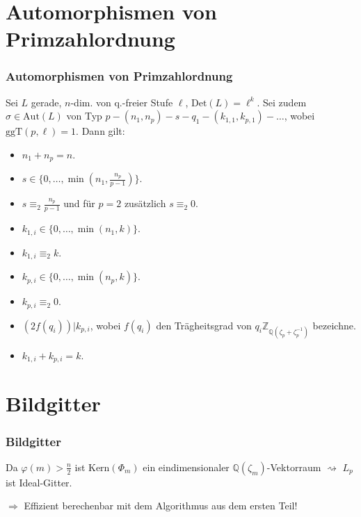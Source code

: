 \documentclass{beamer}
\newcommand{\Z}{\mathbb{Z}}
\newcommand{\Q}{\mathbb{Q}}
\newcommand{\Det}{\text{Det}}
\newcommand{\Kern}{\text{Kern}}
\newcommand{\ggT}{\text{ggT}}
\newcommand{\Aut}{\text{Aut}}
\begin{document}
\section{Automorphismen von Primzahlordnung}
\frame{\tableofcontents[currentsection]}
\begin{frame}[plain]
	\frametitle{Automorphismen von Primzahlordnung}
	\begin{Satz}
		Sei $L$ gerade, $n$-dim. von q.-freier Stufe $\ell$, $\Det(L) = \ell^k$. Sei zudem $\sigma \in \Aut(L)$ von Typ $p - (n_1, n_p) - s - q_1 - (k_{1,1}, k_{p,1}) - \dots$, wobei $\ggT(p, \ell) = 1$. Dann gilt:
		\begin{itemize}
			\item $n_1 + n_p = n$.
			\item $s \in \lbrace 0, \dots, \min(n_1, \frac{n_p}{p-1}) \rbrace$.
			\item $s \equiv_2 \frac{n_p}{p-1}$ und für $p = 2$ zusätzlich $s \equiv_2 0$.
			\item $k_{1,i} \in \lbrace 0, \dots, \min(n_1, k) \rbrace$.
			\item $k_{1,i} \equiv_2 k$.
			\item $k_{p,i} \in \lbrace 0, \dots, \min(n_p, k) \rbrace$.
			\item $k_{p,i} \equiv_2 0$.
			\item $\left( 2f(q_i)\right) \vert k_{p,i}$, wobei $f(q_i)$ den Trägheitsgrad von $q_i \Z_{\Q(\zeta_p + \zeta_p^{-1})}$ bezeichne.
			\item $k_{1,i} + k_{p,i} = k$.
		\end{itemize}
	\end{Satz}
\end{frame}

\section{Bildgitter}
\frame{\tableofcontents[currentsection]}
\begin{frame}[plain]
	\frametitle{Bildgitter}
	Da $\varphi(m) > \frac{n}{2}$ ist $\Kern(\Phi_m)$ ein eindimensionaler $\Q(\zeta_m)$-Vektorraum $\rightsquigarrow$ $L_p$ ist Ideal-Gitter.\par
	\pause
	$\Rightarrow$ Effizient berechenbar mit dem Algorithmus aus dem ersten Teil!
\end{frame}
\end{document}

